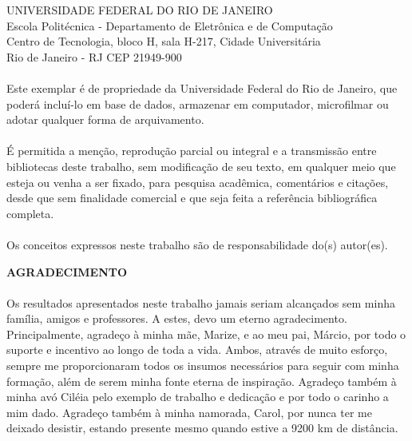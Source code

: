 \pagebreak

      \vspace{0.5cm}

UNIVERSIDADE FEDERAL DO RIO DE JANEIRO \\
Escola Politécnica - Departamento de Eletrônica e de Computação \\
Centro de Tecnologia, bloco H, sala H-217, Cidade Universitária \\ 
Rio de Janeiro - RJ      CEP 21949-900\\
\vspace{0.5cm}
\paragraph{}Este exemplar é de propriedade da Universidade Federal do Rio de Janeiro, que poderá incluí-lo em base de dados, armazenar em computador, microfilmar ou adotar qualquer forma de arquivamento.
\paragraph{}É permitida a menção, reprodução parcial ou integral e a transmissão entre bibliotecas deste trabalho, sem modificação de seu texto, em qualquer meio que esteja ou venha a ser fixado, para pesquisa acadêmica, comentários e citações, desde que sem finalidade comercial e que seja feita a referência bibliográfica completa.
\paragraph{}Os conceitos expressos neste trabalho são de responsabilidade do(s) autor(es).


\pagebreak

\begin{center}
\textbf{AGRADECIMENTO}
\end{center}
      \vspace{0.5cm}

\paragraph{} Os resultados apresentados neste trabalho jamais seriam alcançados sem minha família, amigos e professores. A estes, devo um eterno agradecimento. Principalmente, agradeço à minha mãe, Marize, e ao meu pai, Márcio, por todo o suporte e incentivo ao longo de toda a vida. Ambos, através de muito esforço, sempre me proporcionaram todos os insumos necessários para seguir com minha formação, além de serem minha fonte eterna de inspiração. Agradeço também à minha avó Ciléia pelo exemplo de trabalho e dedicação e por todo o carinho a mim dado. Agradeço também à minha namorada, Carol, por nunca ter me deixado desistir, estando presente mesmo quando estive a 9200 km de distância.

